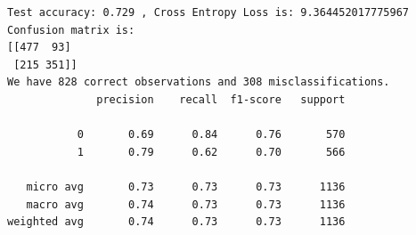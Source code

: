 \documentclass[8pt,onecolumn,aps,pra]{revtex4-1}
\begin{document}
    \begin{Verbatim}[commandchars=\\\{\}]
Test accuracy: 0.729 , Cross Entropy Loss is: 9.364452017775967
Confusion matrix is:
[[477  93]
 [215 351]]
We have 828 correct observations and 308 misclassifications.
              precision    recall  f1-score   support

           0       0.69      0.84      0.76       570
           1       0.79      0.62      0.70       566

   micro avg       0.73      0.73      0.73      1136
   macro avg       0.74      0.73      0.73      1136
weighted avg       0.74      0.73      0.73      1136


    \end{Verbatim}

    \begin{center}
    \end{center}
    { \hspace*{\fill} \\}
    
    \begin{center}
    \end{center}
    { \hspace*{\fill} \\}
    
\end{document}

